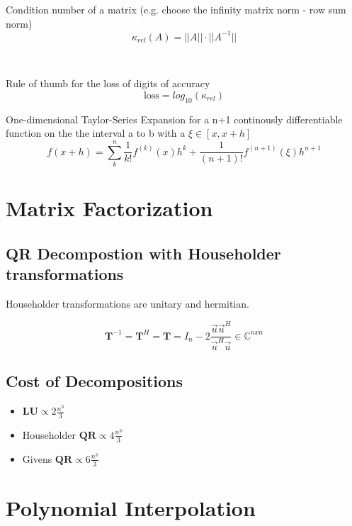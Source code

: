\documentclass[
    a4paper,
    11pt
]{article}
\begin{document}
Condition number of a matrix (e.g. choose the infinity matrix norm - row sum
norm)
\begin{equation}
    \kappa_{rel}(A) = ||A|| \cdot ||A^{-1}||
\end{equation}

\

Rule of thumb for the loss of digits of accuracy
\begin{equation}
    \text{loss} = log_{10}(\kappa_{rel})
\end{equation}

One-dimensional Taylor-Series Expansion for a n+1 continously differentiable
function on the the interval a to b with a $\xi \in [x, x+h]$
\begin{equation}
    f(x+h) = \sum_k^n \frac{1}{k!} f^{(k)}(x)h^k + \frac{1}{(n+1)!}
    f^{(n+1)}(\xi)h^{n+1}
\end{equation}

\section{Matrix Factorization}

\subsection{QR Decompostion with Householder transformations}

Householder transformations are unitary and hermitian.

\begin{equation}
    \mathbf{T}^{-1} = \mathbf{T}^H = \mathbf{T} = I_n - 2
    \frac{\vec{u}\vec{u}^H}{\vec{u}^H\vec{u}} \in \mathbb{C}^{n x n}
\end{equation}

\subsection{Cost of Decompositions}

\begin{itemize}
    \item $\mathbf{LU} \propto 2\frac{n^3}{3}$
    \item Householder $\mathbf{QR} \propto 4\frac{n^3}{3}$
    \item Givens $\mathbf{QR} \propto 6\frac{n^3}{3}$

\end{itemize}

\section{Polynomial Interpolation}
\end{document}
